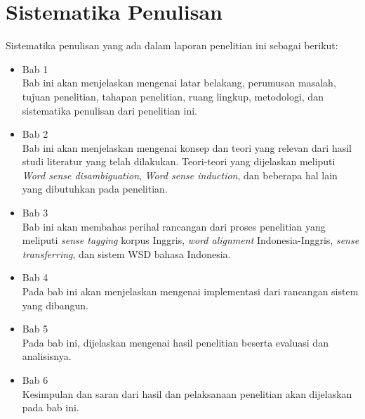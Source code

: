 \section{Sistematika Penulisan}
Sistematika penulisan yang ada dalam laporan penelitian ini sebagai berikut:
\begin{itemize}
	
	\item Bab 1 \babSatu \\
	Bab ini akan menjelaskan mengenai latar belakang, perumusan masalah, tujuan penelitian, tahapan penelitian, ruang lingkup, metodologi, dan sistematika penulisan dari penelitian ini.
	
	\item Bab 2 \babDua \\
	Bab ini akan menjelaskan mengenai konsep dan teori yang relevan dari hasil studi literatur yang telah dilakukan. Teori-teori yang dijelaskan meliputi \textit{Word sense disambiguation}, \textit{Word sense induction}, dan beberapa hal lain yang dibutuhkan pada penelitian.
	
	\item Bab 3 \babTiga \\
	Bab ini akan membahas perihal rancangan dari proses penelitian yang meliputi \textit{sense tagging} korpus Inggris, \textit{word alignment} Indonesia-Inggris, \textit{sense transferring}, dan sistem WSD bahasa Indonesia.
	
	\item Bab 4 \babEmpat \\
	Pada bab ini akan menjelaskan mengenai implementasi dari rancangan sistem yang dibangun.
	
	\item Bab 5 \babLima \\
	Pada bab ini, dijelaskan mengenai hasil penelitian beserta evaluasi dan analisisnya. 
	
	\item Bab 6 \babEnam \\
	Kesimpulan dan saran dari hasil dan pelaksanaan penelitian akan dijelaskan pada bab ini.
	
\end{itemize}